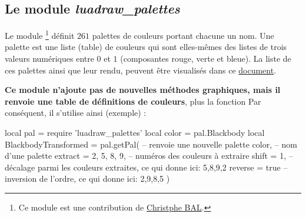 \subsection{Le module \emph{luadraw\_palettes}}

Le module \footnote{Ce module est une contribution de \href{https://github.com/projetmbc/for-writing/tree/main/@prism}{Christphe BAL}.} définit $261$ palettes de couleurs portant chacune un nom. Une palette est une liste (table) de couleurs qui sont elles-mêmes des listes de trois valeurs numériques entre $0$ et $1$ (composantes rouge, verte et bleue). La liste de ces palettes ainsi que leur rendu, peuvent être visualisés dans ce \href{luadraw_palettes_list.pdf}{document}. 

\textbf{Ce module n'ajoute pas de nouvelles méthodes graphiques, mais il renvoie une table de définitions de couleurs}, plus la fonction  Par conséquent, il s'utilise ainsi (exemple) :
\begin{Luacode}
local pal = require 'luadraw_palettes'
local color = pal.Blackbody
local BlackbodyTransformed = pal.getPal( -- renvoie une nouvelle palette
    color, -- nom d'une palette
    {
    extract = {2, 5, 8, 9}, -- numéros des couleurs à extraire
    shift = 1, -- décalage parmi les couleurs extraites, ce qui donne ici: 5,8,9,2
    reverse = true -- inversion de l'ordre, ce qui donne ici: 2,9,8,5    
    }
)
\end{Luacode}
